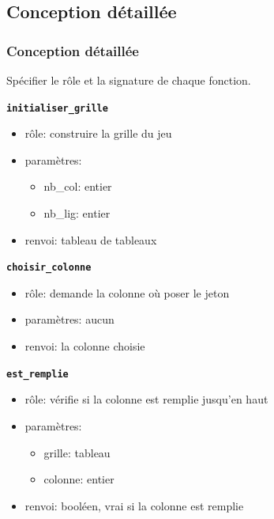 \documentclass[svgnames,11pt]{beamer}
\begin{document}
\subsection{Conception détaillée}
\begin{frame}
    \frametitle{Conception détaillée}

    \begin{aretenir}[Rôle]
    Spécifier le rôle et la signature de chaque fonction.
    \end{aretenir}

\end{frame}

\begin{frame}

    {\Large \textbf{\texttt{initialiser\_grille}}}
    \begin{itemize}
        \item rôle: construire la grille du jeu
        \item paramètres:
        \begin{itemize}
            \item nb\_col: entier
            \item nb\_lig: entier
        \end{itemize}
        \item renvoi: tableau de tableaux
    \end{itemize}

\end{frame}
\begin{frame}

    {\Large \textbf{\texttt{choisir\_colonne}}}
    \begin{itemize}
        \item rôle: demande la colonne où poser le jeton
        \item paramètres: aucun
        \item renvoi: la colonne choisie
    \end{itemize}

\end{frame}
\begin{frame}

    {\Large \textbf{\texttt{est\_remplie}}}
    \begin{itemize}
        \item rôle: vérifie si la colonne est remplie jusqu'en haut
        \item paramètres:
        \begin{itemize}
            \item grille: tableau
            \item colonne: entier
        \end{itemize}
        \item renvoi: booléen, vrai si la colonne est remplie
    \end{itemize}

\end{frame}
\end{document}
